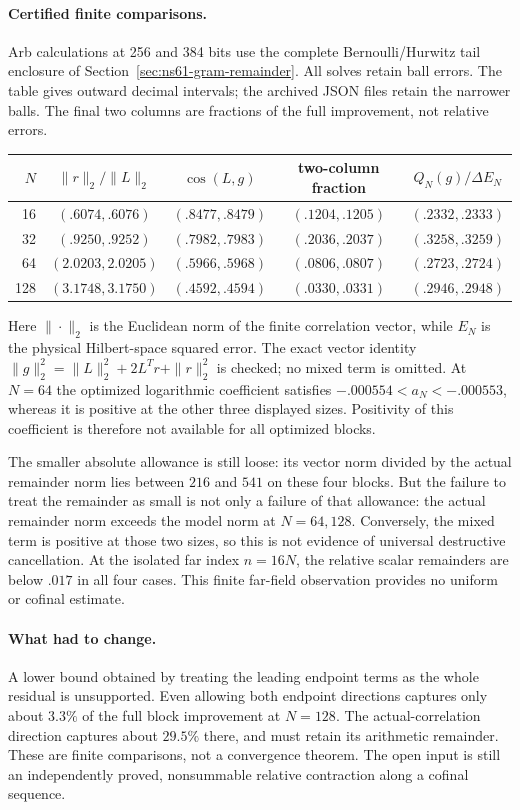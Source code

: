 \paragraph{Certified finite comparisons.}
Arb calculations at 256 and 384 bits use the complete Bernoulli/Hurwitz
tail enclosure of Section~\ref{sec:ns61-gram-remainder}. All solves
retain ball errors. The table gives outward decimal intervals; the
archived JSON files retain the narrower balls. The final two columns
are fractions of the full improvement, not relative errors.
\begin{center}\small
\begin{tabular}{rcccc}
\toprule
$N$ & $\|r\|_2/\|L\|_2$ & $\cos(L,g)$ & two-column fraction
 & $Q_N(g)/\Delta E_N$\\
\midrule
16 & $(.6074,.6076)$ & $(.8477,.8479)$ & $(.1204,.1205)$ & $(.2332,.2333)$\\
32 & $(.9250,.9252)$ & $(.7982,.7983)$ & $(.2036,.2037)$ & $(.3258,.3259)$\\
64 & $(2.0203,2.0205)$ & $(.5966,.5968)$ & $(.0806,.0807)$ & $(.2723,.2724)$\\
128 & $(3.1748,3.1750)$ & $(.4592,.4594)$ & $(.0330,.0331)$ & $(.2946,.2948)$\\
\bottomrule
\end{tabular}\end{center}
Here $\|\cdot\|_2$ is the Euclidean norm of the finite correlation
vector, while $E_N$ is the physical Hilbert-space squared error.
The exact vector identity
$\|g\|_2^2=\|L\|_2^2+2L^Tr+\|r\|_2^2$ is checked;
no mixed term is omitted. At $N=64$ the optimized logarithmic
coefficient satisfies
$-.000554<a_N<-.000553$, whereas it is positive at the other
three displayed sizes. Positivity of this coefficient is therefore
not available for all optimized blocks.

The smaller absolute allowance is still loose: its vector norm divided
by the actual remainder norm lies between $216$ and $541$ on these
four blocks. But the failure to treat the remainder as small is not
only a failure of that allowance: the actual remainder norm exceeds
the model norm at $N=64,128$. Conversely, the mixed term is positive
at those two sizes, so this is not evidence of universal destructive
cancellation. At the isolated far index $n=16N$, the relative scalar
remainders are below $.017$ in all four cases. This finite far-field
observation provides no uniform or cofinal estimate.

\paragraph{What had to change.}
A lower bound obtained by treating the leading endpoint terms as the
whole residual is unsupported. Even allowing both endpoint directions
captures only about $3.3\%$ of the full block improvement at $N=128$.
The actual-correlation direction captures about $29.5\%$ there, and
must retain its arithmetic remainder. These are finite comparisons,
not a convergence theorem. The open input is still an independently
proved, nonsummable relative contraction along a cofinal sequence.


